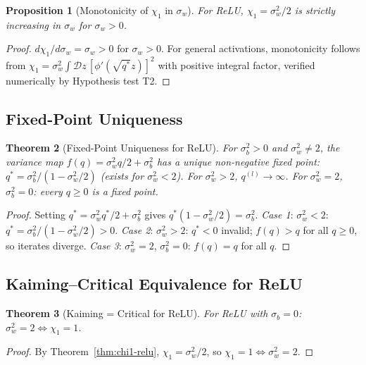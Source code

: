 \documentclass[10pt]{article}
\newtheorem{theorem}{Theorem}
\newtheorem{proposition}[theorem]{Proposition}
\begin{document}
\begin{proposition}[Monotonicity of $\chi_1$ in $\sigma_w$]
\label{prop:monotonicity}
For ReLU, $\chi_1 = \sigma_w^2/2$ is strictly increasing in $\sigma_w$ for $\sigma_w > 0$.
\end{proposition}

\begin{proof}
$d\chi_1/d\sigma_w = \sigma_w > 0$ for $\sigma_w > 0$.
For general activations, monotonicity follows from $\chi_1 = \sigma_w^2 \int \mathcal{D}z\,[\phi'(\sqrt{q^*}z)]^2$ with positive integral factor, verified numerically by Hypothesis test T2.
\end{proof}

\subsection{Fixed-Point Uniqueness}

\begin{theorem}[Fixed-Point Uniqueness for ReLU]
\label{thm:fixed-point}
For $\sigma_b^2 > 0$ and $\sigma_w^2 \neq 2$, the variance map $f(q) = \sigma_w^2 q/2 + \sigma_b^2$ has a unique non-negative fixed point: $q^* = \sigma_b^2/(1 - \sigma_w^2/2)$ (exists for $\sigma_w^2 < 2$).
For $\sigma_w^2 > 2$, $q^{(l)} \to \infty$. For $\sigma_w^2 = 2$, $\sigma_b^2 = 0$: every $q \geq 0$ is a fixed point.
\end{theorem}

\begin{proof}
Setting $q^* = \sigma_w^2 q^*/2 + \sigma_b^2$ gives $q^*(1 - \sigma_w^2/2) = \sigma_b^2$.
\emph{Case 1}: $\sigma_w^2 < 2$: $q^* = \sigma_b^2/(1 - \sigma_w^2/2) > 0$.
\emph{Case 2}: $\sigma_w^2 > 2$: $q^* < 0$ invalid; $f(q) > q$ for all $q \geq 0$, so iterates diverge.
\emph{Case 3}: $\sigma_w^2 = 2$, $\sigma_b^2 = 0$: $f(q) = q$ for all $q$.
\end{proof}

\subsection{Kaiming--Critical Equivalence for ReLU}

\begin{theorem}[Kaiming = Critical for ReLU]
\label{thm:kaiming-critical}
For ReLU with $\sigma_b = 0$: $\sigma_w^2 = 2 \Leftrightarrow \chi_1 = 1$.
\end{theorem}

\begin{proof}
By Theorem~\ref{thm:chi1-relu}, $\chi_1 = \sigma_w^2/2$, so $\chi_1 = 1 \Leftrightarrow \sigma_w^2 = 2$.
\end{proof}
\end{document}
